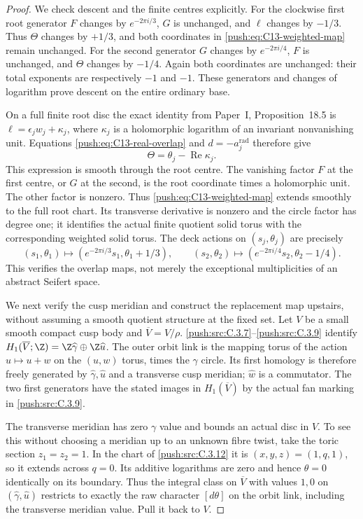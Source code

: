 \begin{proof}
We check descent and the finite centres explicitly. For the
clockwise first root generator $F$ changes by $e^{-2\pi i/3}$,
$G$ is unchanged, and $\ell$ changes by $-1/3$.
Thus $\Theta$ changes by $+1/3$, and both coordinates in
\eqref{push:eq:C13-weighted-map} remain unchanged. For the second
generator $G$ changes by $e^{-2\pi i/4}$, $F$ is unchanged,
and $\Theta$ changes by $-1/4$. Again both coordinates are
unchanged: their total exponents are respectively $-1$ and
$-1$. These generators and changes of logarithm prove descent
on the entire ordinary base.

On a full finite root disc the exact identity from Paper~I, Proposition~18.5 is
$\ell=\epsilon_jw_j+\kappa_j$, where $\kappa_j$ is a
holomorphic logarithm of an invariant nonvanishing unit.
Equations \eqref{push:eq:C13-real-overlap} and $d=-a_j^{\mathrm{rad}}$ therefore give
\[
 \Theta=\theta_j-\operatorname{Re}\kappa_j.
\]
This expression is smooth through the root centre. The vanishing
factor $F$ at the first centre, or $G$ at the second, is the
root coordinate times a holomorphic unit. The other factor is
nonzero. Thus \eqref{push:eq:C13-weighted-map} extends smoothly to
the full root chart. Its transverse derivative is nonzero and
the circle factor has degree one; it identifies the actual
finite quotient solid torus with the corresponding weighted
solid torus. The deck actions on $(s_j,\theta_j)$ are precisely
\[
 (s_1,\theta_1)\mapsto(e^{-2\pi i/3}s_1,\theta_1+1/3),
 \qquad
 (s_2,\theta_2)\mapsto(e^{-2\pi i/4}s_2,\theta_2-1/4).
\]
This verifies the overlap maps, not merely the exceptional
multiplicities of an abstract Seifert space.

We next verify the cusp meridian and construct the replacement
map upstairs, without assuming a smooth quotient structure at
the fixed set. Let $V$ be a small smooth compact cusp body and
$\overline V=V/\rho$. \ref{push:src:C.3.7}--\ref{push:src:C.3.9} identify
$H_1(\overline V;\Z)=\Z\widehat\gamma\oplus\Z\widehat u$.
The outer orbit link is the mapping torus of the action
$u\mapsto u+w$ on the $(u,w)$ torus, times the $\gamma$ circle.
Its first homology is therefore freely generated by
$\widehat\gamma,\widehat u$ and a transverse cusp meridian;
$\widehat w$ is a commutator. The two first generators have
the stated images in $H_1(\overline V)$ by the actual fan marking
in \ref{push:src:C.3.9}.

The transverse meridian has zero $\gamma$ value and bounds
an actual disc in $V$. To see this without choosing a meridian
up to an unknown fibre twist, take the toric section
$z_1=z_2=1$. In the chart of \ref{push:src:C.3.12} it is
$(x,y,z)=(1,q,1)$, so it extends across $q=0$.
Its additive logarithms are zero and hence $\theta=0$
identically on its boundary. Thus the integral class on
$\overline V$ with values $1,0$ on
$(\widehat\gamma,\widehat u)$ restricts to exactly the raw
character $[d\theta]$ on the orbit link, including the transverse
meridian value. Pull it back to $V$.


\end{proof}
